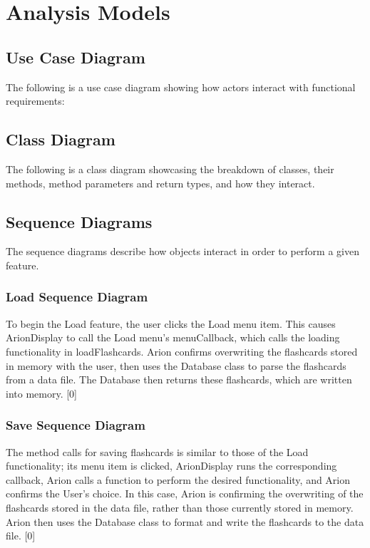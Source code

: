 \documentclass{scrreprt}
\begin{document}
\section{Analysis Models}
\subsection{Use Case Diagram}
The following is a use case diagram showing how actors interact with functional requirements:

\subsection{Class Diagram}
The following is a class diagram showcasing the breakdown of classes, their methods, method parameters and return types, and how they interact.
{\fontsize{8}{10}\selectfont
    \textbf{
    }
}

\subsection{Sequence Diagrams}
The sequence diagrams describe how objects interact in order to perform a given feature.

\subsubsection*{Load Sequence Diagram}
To begin the Load feature, the user clicks the Load menu item.
This causes ArionDisplay to call the Load menu's menuCallback, which calls the loading functionality in loadFlashcards.
Arion confirms overwriting the flashcards stored in memory with the user, then uses the Database class to parse the flashcards from a data file.
The Database then returns these flashcards, which are written into memory.
[0]

\subsubsection*{Save Sequence Diagram}
The method calls for saving flashcards is similar to those of the Load functionality;
    its menu item is clicked, ArionDisplay runs the corresponding callback, Arion calls a function to perform the desired functionality,
    and Arion confirms the User's choice.
In this case, Arion is confirming the overwriting of the flashcards stored in the data file, rather than those currently stored in memory.
Arion then uses the Database class to format and write the flashcards to the data file.
[0]
\end{document}
